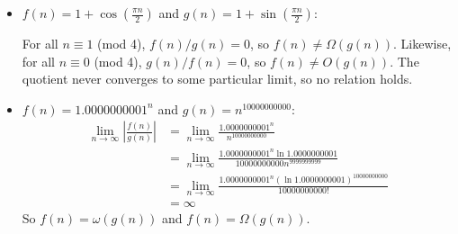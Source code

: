 \documentclass[12pt,twoside]{article}
\begin{document}
\begin{problem}{20}
{\begin{itemize}
\item $f(n) = 1+\cos\left(\frac{\pi n}{2}\right)$ and $g(n) = 1+\sin\left(\frac{\pi n}{2}\right)$:

	For all $n \equiv 1$ (mod 4), $f(n)/g(n) = 0$, so $f(n) \not= \Omega(g(n))$. Likewise, for all $n \equiv 0$ (mod 4), 
$g(n)/f(n) = 0$, so $f(n) \not= O(g(n))$.  The quotient never converges to some particular limit, so no relation holds.

\item $f(n) = {1.0000000001}^n$ and $g(n) = n^{10000000000}$:
\begin{align*}
   	\lim_{n\to\infty} \left|\frac{f(n)}{g(n)}\right|
	&= \lim_{n\to\infty} \frac{1.0000000001^n}{n^{10000000000}} \\
	&= \lim_{n\to\infty} \frac{1.0000000001^n \ln 1.0000000001}{10000000000n^{9999999999}} \\
	&= \lim_{n\to\infty} \frac{1.0000000001^n (\ln 1.0000000001)^{10000000000}}{10000000000!} \\
	&= \infty
  \end{align*}
	 So $f(n) = \omega(g(n))$ and $f(n) = \Omega(g(n))$.

	
 \end{itemize}

}
\end{problem}
\end{document}
